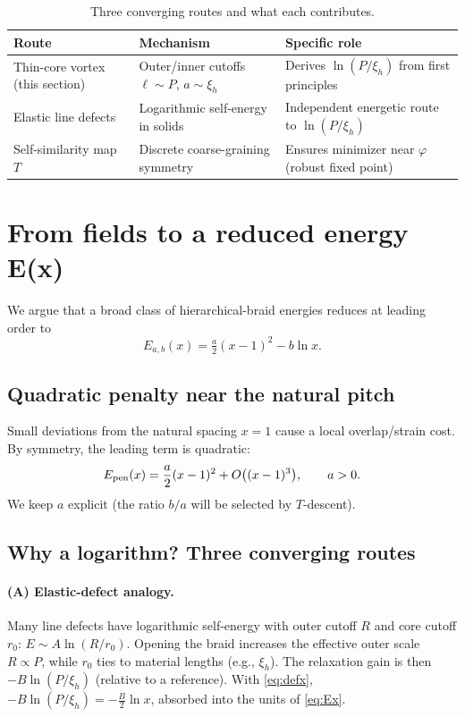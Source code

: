 \documentclass[11pt]{article}
\theoremstyle{remark}
\theoremstyle{definition}
\begin{document}
\begin{table}[t]
\centering
\caption{Three converging routes and what each contributes.}
\begin{tabularx}{\textwidth}{|Y|Y|Y|}
\hline
\textbf{Route} & \textbf{Mechanism} & \textbf{Specific role} \\
\hline
Thin-core vortex (this section) & Outer/inner cutoffs $\ell\sim P$, $a\sim \xi_h$ & Derives $\ln(P/\xi_h)$ from first principles \\
Elastic line defects & Logarithmic self-energy in solids & Independent energetic route to $\ln(P/\xi_h)$ \\
Self-similarity map $T$ & Discrete coarse-graining symmetry & Ensures minimizer near $\varphi$ (robust fixed point) \\
\hline
\end{tabularx}
\end{table}

\section{From fields to a reduced energy E(x)}
We argue that a broad class of hierarchical-braid energies reduces at leading order to
\begin{equation}
 E_{a,b}(x)=\tfrac{a}{2}(x-1)^2-b\ln x.
 \label{eq:Ex}
\end{equation}
\subsection{Quadratic penalty near the natural pitch}
Small deviations from the natural spacing $x=1$ cause a local overlap/strain cost. By symmetry, the leading term is quadratic:
\begin{equation}
 E_{\rm pen}(x)=\frac{a}{2}(x-1)^2+O\bigl((x-1)^3\bigr),\qquad a>0.
\end{equation}
We keep $a$ explicit (the ratio $b/a$ will be selected by $T$-descent).

\subsection{Why a logarithm? Three converging routes}
\paragraph{(A) Elastic-defect analogy.} Many line defects have logarithmic self-energy with outer cutoff $R$ and core cutoff $r_0$: $E\sim A\ln(R/r_0)$. Opening the braid increases the effective outer scale $R\propto P$, while $r_0$ ties to material lengths (e.g., $\xi_h$). The relaxation gain is then $-B\ln(P/\xi_h)$ (relative to a reference). With \eqref{eq:defx}, $-B\ln(P/\xi_h)=-\tfrac{B}{2}\ln x$, absorbed into the units of \eqref{eq:Ex}.
\end{document}
